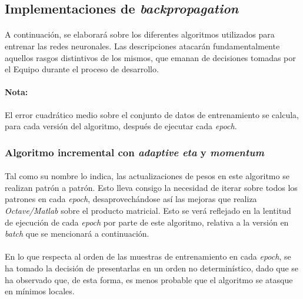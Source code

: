 \documentclass[12pt, twocolumn]{article}
\begin{document}
	\subsection{Implementaciones de \textit{backpropagation}}
	
	\paragraph{} A continuación, se elaborará sobre los diferentes algoritmos utilizados para entrenar las redes neuronales. Las descripciones atacarán fundamentalmente aquellos rasgos distintivos de los mismos, que emanan de decisiones tomadas por el Equipo durante el proceso de desarrollo.
	
	\paragraph{Nota:} El error cuadrático medio sobre el conjunto de datos de entrenamiento se calcula, para cada versión del algoritmo, después de ejecutar cada \textit{epoch}.
	
	\subsubsection{Algoritmo incremental con \textit{adaptive eta} y \textit{momentum}}
	
	\paragraph{} Tal como su nombre lo indica, las actualizaciones de pesos en este algoritmo se realizan patrón a patrón. Esto lleva consigo la necesidad de iterar sobre todos los patrones en cada \textit{epoch}, desaprovechándose así las mejoras que realiza \textit{Octave/Matlab} sobre el producto matricial. Esto se verá reflejado en la lentitud de ejecución de cada \textit{epoch} por parte de este algoritmo, relativa a la versión en \textit{batch} que se mencionará a continuación.
	
	\paragraph{} En lo que respecta al orden de las muestras de entrenamiento en cada \textit{epoch}, se ha tomado la decisión de presentarlas en un orden no determinístico, dado que se ha observado que, de esta forma, es menos probable que el algoritmo se atasque en mínimos locales. 
	
\end{document}
